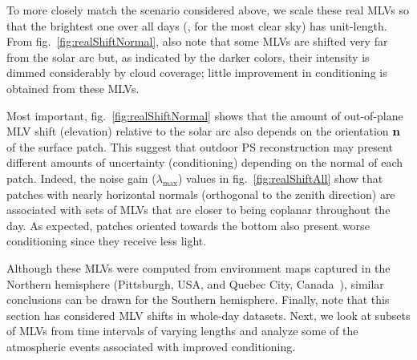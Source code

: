 To more closely match the scenario considered above, we scale these real MLVs so that the brightest one over all days (\ie, for the most clear sky) has unit-length. From fig.~\ref{fig:realShiftNormal}, also note that some MLVs are shifted very far from the solar arc but, as indicated by the darker colors, their intensity is dimmed considerably by cloud coverage; little improvement in conditioning is obtained from these MLVs. 

Most important, fig.~\ref{fig:realShiftNormal} shows that the amount of out-of-plane MLV shift (elevation) relative to the solar arc also depends on the orientation ${\bf n}$ of the surface patch. This suggest that outdoor PS reconstruction may present different amounts of uncertainty (conditioning) depending on the normal of each patch. Indeed, the noise gain ($\lambda_{\max}$) values in fig.~\ref{fig:realShiftAll} show that patches with nearly horizontal normals (orthogonal to the zenith direction) are associated with sets of MLVs that are closer to being coplanar throughout the day. As expected, patches oriented towards the bottom also present worse conditioning since they receive less light. 


Although these MLVs were computed from environment maps captured in the Northern hemisphere (Pittsburgh, USA, and Quebec City, Canada~\cite{holdgeoffroy-iccp-15}), similar conclusions can be drawn for the Southern hemisphere. Finally, note that this section has considered MLV shifts in whole-day datasets. Next, we look at subsets of MLVs from time intervals of varying lengths and analyze some of the atmospheric events associated with improved conditioning. 



